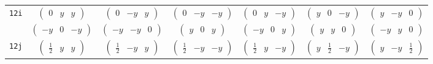 \documentclass[fleqn,9pt,landscape]{jsarticle}
\begin{document}
\begin{center}
\begin{longtable}{ccccccc}
{\tt 12i} & $ \begin{pmatrix} 0 & y & y \end{pmatrix} $ & $ \begin{pmatrix} 0 & - y & y \end{pmatrix} $ & $ \begin{pmatrix} 0 & - y & - y \end{pmatrix} $ & $ \begin{pmatrix} 0 & y & - y \end{pmatrix} $ & $ \begin{pmatrix} y & 0 & - y \end{pmatrix} $ & $ \begin{pmatrix} y & - y & 0 \end{pmatrix} $ \\
& $ \begin{pmatrix} - y & 0 & - y \end{pmatrix} $ & $ \begin{pmatrix} - y & - y & 0 \end{pmatrix} $ & $ \begin{pmatrix} y & 0 & y \end{pmatrix} $ & $ \begin{pmatrix} - y & 0 & y \end{pmatrix} $ & $ \begin{pmatrix} y & y & 0 \end{pmatrix} $ & $ \begin{pmatrix} - y & y & 0 \end{pmatrix} $ \\ \hline
{\tt 12j} & $ \begin{pmatrix} \frac{1}{2} & y & y \end{pmatrix} $ & $ \begin{pmatrix} \frac{1}{2} & - y & y \end{pmatrix} $ & $ \begin{pmatrix} \frac{1}{2} & - y & - y \end{pmatrix} $ & $ \begin{pmatrix} \frac{1}{2} & y & - y \end{pmatrix} $ & $ \begin{pmatrix} y & \frac{1}{2} & - y \end{pmatrix} $ & $ \begin{pmatrix} y & - y & \frac{1}{2} \end{pmatrix} $ \\

\end{longtable}
\end{center}
\end{document}
